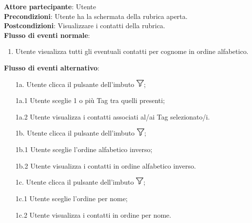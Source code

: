 \begin{tcolorbox}[colback=white,colframe=black!80!white,title=\textbf{C6 - Visualizzare rubrica}]
	\textbf{Attore partecipante}: Utente
	\\\textbf{Precondizioni}: Utente ha la schermata della rubrica aperta.
	\\\textbf{Postcondizioni}: Visualizzare i contatti della rubrica.
	\\\textbf{Flusso di eventi normale}:
	\begin{enumerate}[noitemsep, topsep=0pt]
		\item Utente visualizza tutti gli eventuali contatti per cognome in ordine alfabetico.
	\end{enumerate}
	\textbf{Flusso di eventi alternativo}:
	\begin{itemize}[noitemsep, topsep=0pt]
		\item[1a. ] Utente clicca il pulsante dell’imbuto \includegraphics[height=0.4cm]{images/imbuto_icona.jpeg};
		\item[1a.1]	Utente sceglie 1 o più Tag tra quelli presenti;
		\item[1a.2]	Utente visualizza i contatti associati al/ai Tag selezionato/i.
		\item[1b. ] Utente clicca il pulsante dell’imbuto \includegraphics[height=0.4cm]{images/imbuto_icona.jpeg};
		\item[1b.1]	Utente sceglie l’ordine alfabetico inverso;
		\item[1b.2]	Utente visualizza i contatti in ordine alfabetico inverso.
		\item[1c. ] Utente clicca il pulsante dell’imbuto \includegraphics[height=0.4cm]{images/imbuto_icona.jpeg};
		\item[1c.1]	Utente sceglie l’ordine per nome;
		\item[1c.2]	Utente visualizza i contatti in ordine per nome.
	\end{itemize}
\end{tcolorbox}

